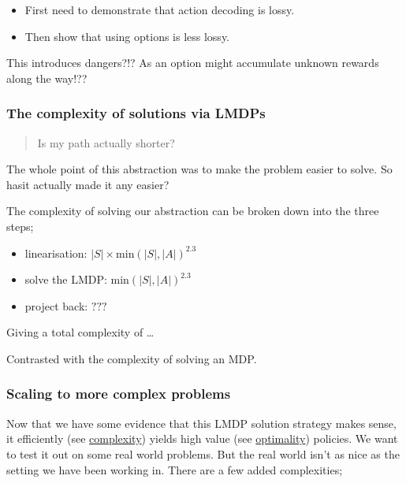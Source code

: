 \begin{itemize}
\tightlist
\item
  First need to demonstrate that action decoding is lossy.
\item
  Then show that using options is less lossy.
\end{itemize}

This introduces dangers?!? As an option might accumulate unknown rewards
along the way!??

\hypertarget{the-complexity-of-solutions-via-lmdps}{%
\subsubsection{The complexity of solutions via
LMDPs}\label{the-complexity-of-solutions-via-lmdps}}

\begin{quote}
Is my path actually shorter?
\end{quote}

The whole point of this abstraction was to make the problem easier to
solve. So hasit actually made it any easier?

The complexity of solving our abstraction can be broken down into the
three steps;

\begin{itemize}
\tightlist
\item
  linearisation: \(|S| \times \text{min}(|S|,|A|)^{2.3}\)
\item
  solve the LMDP: \(\text{min}(|S|,|A|)^{2.3}\)
\item
  project back: \(???\)
\end{itemize}

Giving a total complexity of \ldots{}

Contrasted with the complexity of solving an MDP.

\hypertarget{scaling-to-more-complex-problems}{%
\subsubsection{Scaling to more complex
problems}\label{scaling-to-more-complex-problems}}

Now that we have some evidence that this LMDP solution strategy makes
sense, it efficiently (see \href{}{complexity}) yields high value (see
\href{}{optimality}) policies. We want to test it out on some real world
problems. But the real world isn't as nice as the setting we have been
working in. There are a few added complexities;

